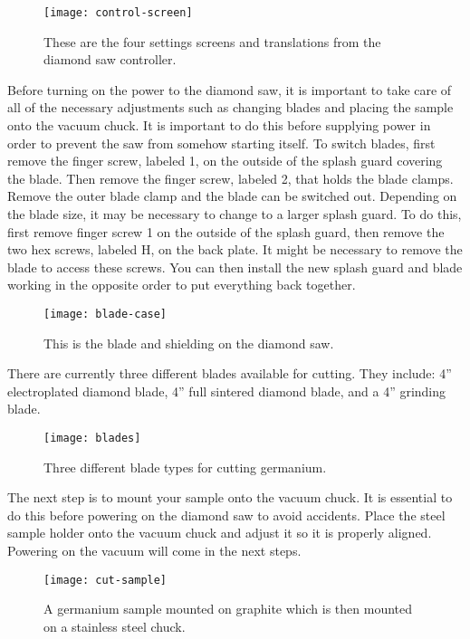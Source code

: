\begin{sidewaysfigure}
\texttt{[image: control-screen]}
\caption{These are the four settings screens and translations from the diamond saw controller.}
\label{fig:control-screen}
\end{sidewaysfigure}

Before turning on the power to the diamond saw, it is important to take care of all of the necessary adjustments such as changing blades and placing the sample onto the vacuum chuck.
It is important to do this before supplying power in order to prevent the saw from somehow starting itself.
To switch blades, first remove the finger screw, labeled 1, on the outside of the splash guard covering the blade. Then remove the finger screw, labeled 2, that holds the blade clamps.
Remove the outer blade clamp and the blade can be switched out.
Depending on the blade size, it may be necessary to change to a larger splash guard.
To do this, first remove finger screw 1 on the outside of the splash guard, then remove the two hex screws, labeled H, on the back plate.
It might be necessary to remove the blade to access these screws.
You can then install the new splash guard and blade working in the opposite order to put everything back together.
\begin{figure}[htpb]
\centering
\texttt{[image: blade-case]}
\caption{This is the blade and shielding on the diamond saw.}
\label{fig:blade-case}
\end{figure}

There are currently three different blades available for cutting.
They include: 4” electroplated diamond blade, 4” full sintered diamond blade, and a 4” grinding blade. 
\begin{figure}[htpb]
\centering
\texttt{[image: blades]}
\caption{Three different blade types for cutting germanium.}
\label{fig:blades}
\end{figure}

The next step is to mount your sample onto the vacuum chuck.
It is essential to do this before powering on the diamond saw to avoid accidents.
Place the steel sample holder onto the vacuum chuck and adjust it so it is properly aligned.
Powering on the vacuum will come in the next steps.
\begin{figure}[htpb]
\centering
\texttt{[image: cut-sample]}
\caption{A germanium sample mounted on graphite which is then mounted on a stainless steel chuck.}
\label{fig:cut-sample}
\end{figure}

